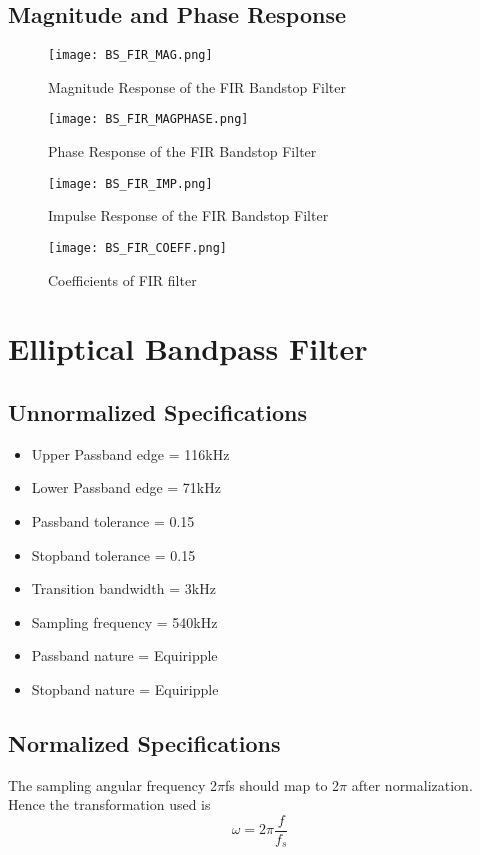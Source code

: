 \documentclass[12pt]{article}
\begin{document}
\subsection{\textbf{Magnitude and Phase Response}}

\begin{figure}[H]
\centering
\texttt{[image: BS\_FIR\_MAG.png]}
\caption{Magnitude Response of the FIR Bandstop Filter}
\label{fig:mesh2}
\end{figure}

\begin{figure}[h]
\centering
\texttt{[image: BS\_FIR\_MAGPHASE.png]}
\caption{Phase Response of the FIR Bandstop Filter}
\label{fig:mesh2}
\end{figure}

\begin{figure}[H]
\centering
\texttt{[image: BS\_FIR\_IMP.png]}
\caption{Impulse Response of the FIR Bandstop Filter}
\label{fig:mesh2}
\end{figure}
\begin{figure}[H]
\centering
\texttt{[image: BS\_FIR\_COEFF.png]}
\caption{Coefficients of FIR filter}
\label{fig:mesh2}
\end{figure}

\newpage
\section{Elliptical Bandpass Filter}
\subsection{\textbf{Unnormalized Specifications}}
\begin{itemize}
    \item Upper Passband edge = 116kHz
    \item Lower Passband edge = 71kHz
    \item Passband tolerance = 0.15
    \item Stopband tolerance = 0.15
    \item Transition bandwidth = 3kHz
    \item Sampling frequency = 540kHz
    \item Passband nature = Equiripple
    \item Stopband nature = Equiripple
\end{itemize}

\subsection{\textbf{Normalized Specifications}}
The sampling angular frequency 2$\pi$fs should map to 2$\pi$ after normalization.
Hence the transformation used is
\begin{equation*}
    \omega = 2\pi\frac{f}{f_s}
\end{equation*}
\\
\end{document}
